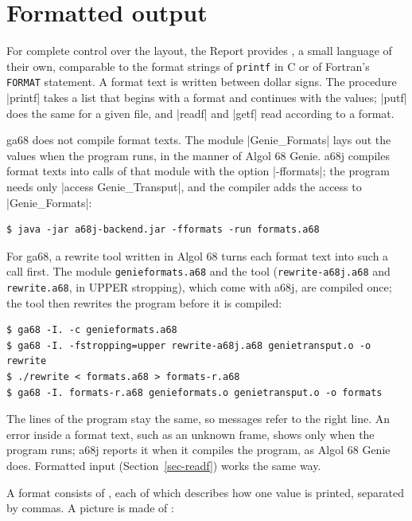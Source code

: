 \section{Formatted output}\label{sec-formats}

For complete control over the layout, the Report provides
, a small language of their own, comparable to the format
strings of \texttt{printf} in C or of Fortran's \texttt{FORMAT}
statement. A format text is written between dollar signs. The procedure
\code|printf| takes a list that begins with a format and continues with
the values; \code|putf| does the same for a given file, and
\code|readf| and \code|getf| read according to a format.


\begin{implnote}
ga68 does not compile format texts. The module \code|Genie_Formats|
lays out the values when the program runs, in the manner of Algol 68
Genie. a68j compiles format texts into calls of that module with the
option \code|-fformats|; the program needs only
\code|access Genie_Transput|, and the compiler adds the access to
\code|Genie_Formats|:
\begin{lstlisting}[style=shell]
$ java -jar a68j-backend.jar -fformats -run formats.a68
\end{lstlisting}
For ga68, a rewrite tool written in Algol 68 turns each format text into
such a call first. The module \texttt{genieformats.a68} and the tool
(\texttt{rewrite-a68j.a68} and \texttt{rewrite.a68}, in UPPER stropping),
which come with a68j, are compiled once; the tool then rewrites the
program before it is compiled:
\begin{lstlisting}[style=shell]
$ ga68 -I. -c genieformats.a68
$ ga68 -I. -fstropping=upper rewrite-a68j.a68 genietransput.o -o rewrite
$ ./rewrite < formats.a68 > formats-r.a68
$ ga68 -I. formats-r.a68 genieformats.o genietransput.o -o formats
\end{lstlisting}
The lines of the program stay the same, so messages refer to the right
line. An error inside a format text, such as an unknown frame, shows only
when the program runs; a68j reports it when it compiles the program, as
Algol 68 Genie does. Formatted input (Section~\ref{sec-readf}) works
the same way.
\end{implnote}

A format consists of , each of which describes how one
value is printed, separated by commas. A picture is made of
:

